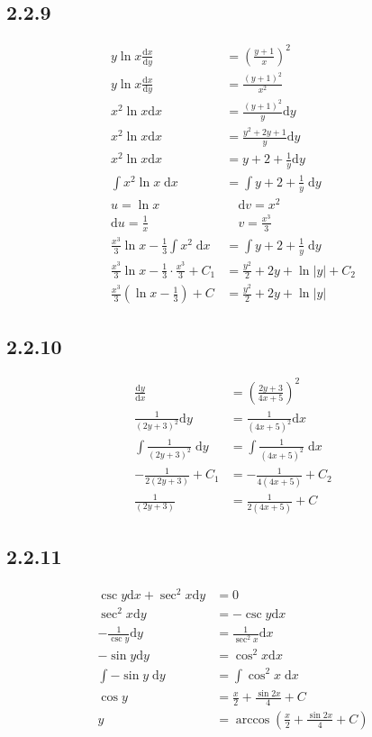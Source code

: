\documentclass{article}
\begin{document}
\subsection{2.2.9}
\begin{align*}
    y\ln x \frac{\mathrm{d}x}{\mathrm{d}y} &= \left(\frac{y+1}{x}\right)^2 \\
    y\ln x \frac{\mathrm{d}x}{\mathrm{d}y} &= \frac{\left(y+1\right)^2}{x^2}\\
    x^2 \ln x \mathrm{d}x  &=  \frac{(y+1)^2}{y}\mathrm{d}y \\
    x^2 \ln x \mathrm{d}x  &=  \frac{y^2+2y+1}{y}\mathrm{d}y \\
    x^2 \ln x \mathrm{d}x  &=  y+2+\frac{1}{y}\mathrm{d}y \\
    \int x^2 \ln x \; \mathrm{d}x  &= \int y+2+\frac{1}{y} \; \mathrm{d}y \\
    u  = \ln x \quad & \quad \mathrm{d}v = x^2 \\
    \mathrm{d}u = \frac{1}{x} \quad & \quad v  = \frac{x^3}{3} \\ 
   \frac{x^3}{3}\ln x-\frac{1}{3} \int x^2  \; \mathrm{d}x  &= \int y+2+\frac{1}{y} \; \mathrm{d}y \\
   \frac{x^3}{3}\ln x-\frac{1}{3} \cdot \frac{x^3}{3} +C_1 &= \frac{y^2}{2}+2y+\ln|y| +C_2 \\
   \frac{x^3}{3}\left(\ln x-\frac{1}{3}\right)+C  &= \frac{y^2}{2}+2y+\ln |y|
\end{align*}

\subsection{2.2.10}
\begin{align*}
    \frac{\mathrm{d}y}{\mathrm{d}x} &= \left(\frac{2y+3}{4x+5}\right)^2 \\
    \frac{1}{(2y+3)^2}\mathrm{d}y &= \frac{1}{(4x+5)^2}\mathrm{d}x \\
    \int \frac{1}{(2y+3)^2} \; \mathrm{d}y &= \int \frac{1}{(4x+5)^2} \; \mathrm{d}x\\
    -\frac{1}{2(2y+3)}+C_1 &= -\frac{1}{4(4x+5)} +C_2\\
    \frac{1}{(2y+3)} &= \frac{1}{2(4x+5)} +C
\end{align*}

\subsection{2.2.11}
\begin{align*}
    \csc y \mathrm{d}x+\sec^2x\mathrm{d}y &= 0\\
    \sec^2x\mathrm{d}y &= -\csc y \mathrm{d}x\\
    -\frac{1}{\csc y}\mathrm{d}y  &= \frac{1}{\sec^2x}\mathrm{d}x\\
    -\sin y \mathrm{d}y &= \cos ^2x\mathrm{d}x\\
    \int -\sin y \; \mathrm{d}y &= \int \cos ^2x \; \mathrm{d}x\\
    \cos y &= \frac{x}{2}+\frac{\sin 2x}{4}+C\\
     y &= \arccos\left( \frac{x}{2}+\frac{\sin 2x}{4}+C\right)
\end{align*}
\end{document}
